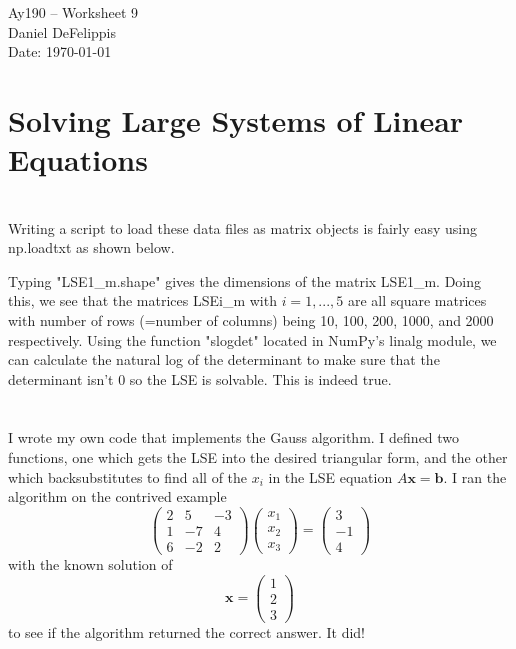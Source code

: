 \documentclass[11pt,letterpaper]{article}
\begin{document}
\begin{center}
\Large
Ay190 -- Worksheet 9\\
Daniel DeFelippis\\
Date: \today
\end{center}


\section*{Solving Large Systems of Linear Equations}

\section{}

Writing a script to load these data files as matrix objects is fairly easy
using np.loadtxt as shown below.

Typing "LSE1\_m.shape" gives the dimensions of the matrix LSE1\_m. Doing this,
we see that the matrices LSEi\_m with $i = 1,...,5$ are all square matrices with
number of rows (=number of columns) being 10, 100, 200, 1000, and 2000 respectively.
Using the function "slogdet" located in NumPy's linalg module, we can calculate 
the natural log of the determinant to make sure that the determinant isn't 0 so the 
LSE is solvable. This is indeed true.

\section{}

I wrote my own code that implements the Gauss algorithm. I defined two functions,
one which gets the LSE into the desired triangular form, and the other which 
backsubstitutes to find all of the $x_i$ in the LSE equation $A\textbf{x} = \textbf{b}$.
I ran the algorithm on the contrived example
$$\begin{pmatrix}
2 & 5 & -3 \\
1 & -7 & 4 \\
6 & -2 & 2 
\end{pmatrix}
\begin{pmatrix}
x_1 \\
x_2 \\
x_3 
\end{pmatrix}
=
\begin{pmatrix}
3 \\
-1 \\
4
\end{pmatrix}$$
with the known solution of 
$$ \textbf{x} = \begin{pmatrix}
1 \\
2 \\
3
\end{pmatrix}$$ to see if the algorithm returned the correct answer. It did!
\end{document}
